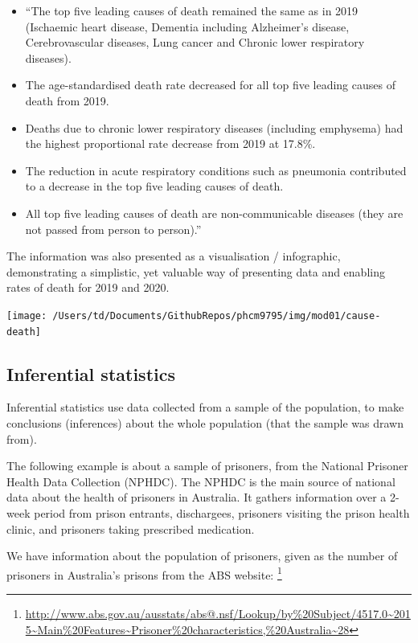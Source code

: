 \documentclass[
]{memoir}
\providecommand{\tightlist}{%
  \setlength{\itemsep}{0pt}\setlength{\parskip}{0pt}}
\begin{document}
\begin{itemize}
\tightlist
\item
  ``The top five leading causes of death remained the same as in 2019 (Ischaemic heart disease, Dementia including Alzheimer's disease, Cerebrovascular diseases, Lung cancer and Chronic lower respiratory diseases).
\item
  The age-standardised death rate decreased for all top five leading causes of death from 2019.
\item
  Deaths due to chronic lower respiratory diseases (including emphysema) had the highest proportional rate decrease from 2019 at 17.8\%.
\item
  The reduction in acute respiratory conditions such as pneumonia contributed to a decrease in the top five leading causes of death.
\item
  All top five leading causes of death are non-communicable diseases (they are not passed from person to person).''
\end{itemize}

The information was also presented as a visualisation / infographic, demonstrating a simplistic, yet valuable way of presenting data and enabling rates of death for 2019 and 2020.

\texttt{[image: /Users/td/Documents/GithubRepos/phcm9795/img/mod01/cause-death]}

\hypertarget{inferential-statistics}{%
\subsection{Inferential statistics}\label{inferential-statistics}}

Inferential statistics use data collected from a sample of the population, to make conclusions (inferences) about the whole population (that the sample was drawn from).

The following example is about a sample of prisoners, from the National Prisoner Health Data Collection (NPHDC). The NPHDC is the main source of national data about the health of prisoners in Australia. It gathers information over a 2-week period from prison entrants, dischargees, prisoners visiting the prison health clinic, and prisoners taking prescribed medication.

We have information about the population of prisoners, given as the number of prisoners in Australia's prisons from the ABS website: \footnote{\url{http://www.abs.gov.au/ausstats/abs@.nsf/Lookup/by\%20Subject/4517.0~2015~Main\%20Features~Prisoner\%20characteristics,\%20Australia~28}}
\end{document}
